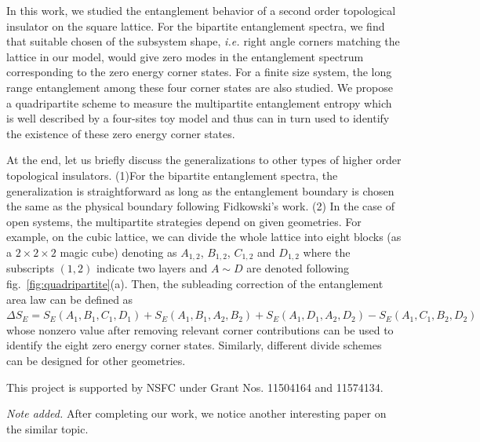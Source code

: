 \documentclass[doublecol]{epl2} %
\newcommand{\ie}{\textit{i.e.{ }}}
\begin{document}
In this work, we studied the entanglement behavior of a second order topological insulator on the square lattice. For the bipartite entanglement spectra, we find that suitable chosen of the subsystem shape, \ie right angle corners matching the lattice in our model, would give zero modes in the entanglement spectrum corresponding to the zero energy corner states. For a finite size system, the long range entanglement among these four corner states are also studied. We propose a quadripartite scheme to measure the multipartite entanglement entropy which is well described by a four-sites toy model and thus can in turn used to identify the existence of these zero energy corner states. 

At the end, let us briefly discuss the generalizations to other types of higher order topological insulators. (1)For the bipartite entanglement spectra, the generalization is straightforward as long as the entanglement boundary is chosen the same as the physical boundary following Fidkowski's work. \cite{Fidkowski_PRL_2010} (2) In the case of open systems, the multipartite strategies depend on given geometries. For example, on the cubic lattice, we can divide the whole lattice into eight blocks (as a $2\times2\times2$ magic cube) denoting as $A_{1,2}$, $B_{1,2}$, $C_{1,2}$ and $D_{1,2}$ where the subscripts $(1,2)$ indicate two layers and $A\sim D$ are denoted following fig.~\ref{fig:quadripartite}(a). Then, the subleading correction of the entanglement area law can be defined as $\Delta S_E= S_E(A_1,B_1,C_1,D_1)+S_E(A_1,B_1,A_2,B_2)+S_E(A_1,D_1,A_2,D_2)-S_E(A_1,C_1,B_2,D_2)$ whose nonzero value after removing relevant corner contributions can be used to identify the eight zero energy corner states. Similarly, different divide schemes can be designed for other geometries. 


\acknowledgments
This project is supported by NSFC under Grant Nos. 11504164 and 11574134.

{\it Note added.} After completing our work, we notice another interesting paper \cite{Fukui_PRB_2018} on the similar topic.

%
%
%
%


\end{document}
